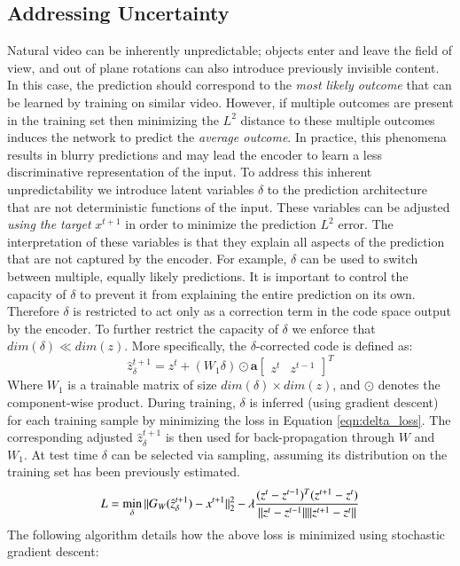 \subsection{Addressing Uncertainty} 
\label{subsec:uncertainty} 
Natural video can be inherently unpredictable; objects enter and leave the field of view, and out of plane rotations can also introduce previously invisible content. In this case, the prediction should correspond to the \emph{most likely outcome} that can be learned by training on similar video. However, if multiple outcomes are present in the training set then minimizing the $L^2$ distance to these multiple outcomes induces the network to predict the \emph{average outcome}. In practice, this phenomena results in blurry predictions and may lead the encoder to learn a less discriminative representation of the input. To address this inherent unpredictability we introduce latent variables $\delta$ to the prediction architecture that are not deterministic functions of the input. These variables can be adjusted \emph{using the target} $x^{t+1}$ in order to minimize the prediction $L^2$ error. The interpretation of these variables is that they explain all aspects of the prediction that are not captured by the encoder. For example, $\delta$ can be used to switch between multiple, equally likely predictions. It is important to control the capacity of $\delta$ to prevent it from explaining the entire prediction on its own. Therefore $\delta$ is restricted to act only as a correction term in the code space output by the encoder. To further restrict the capacity of $\delta$ we enforce that $dim(\delta) \ll dim(z)$. 
More specifically, the $\delta$-corrected code is defined as:
\begin{equation} 
\label{eqn:delta}
\hat z^{t+1}_\delta =  z^{t} + (W_1 \delta) \odot \mathbf{a}\begin{bmatrix}z^t&z^{t-1}\end{bmatrix}^T
\end{equation}  
Where $W_1$ is a trainable matrix of size $dim(\delta) \times dim(z)$, and $\odot$ denotes the component-wise product.  
During training, $\delta$ is inferred (using gradient descent) for each training sample by minimizing the loss in Equation \ref{eqn:delta_loss}. The corresponding adjusted $\hat z_\delta ^{t+1}$ is then used for back-propagation through $W$ and $W_1$. At test time $\delta$ can be selected via sampling, assuming its distribution on the training set has been previously estimated.
\begin{equation} 
\label{eqn:delta_loss}
L = \min\limits_\delta \| G_W(\hat z_\delta ^{t+1}) - x^{t+1} \|^2_2 - \lambda \frac{(z^t - z^{t-1})^T(z^{t+1} - z^t)}{\|z^t-z^{t-1}\| \|z^{t+1} - z^t\|} \\
\end{equation} 
The following algorithm details how the above loss is minimized using stochastic gradient descent:

